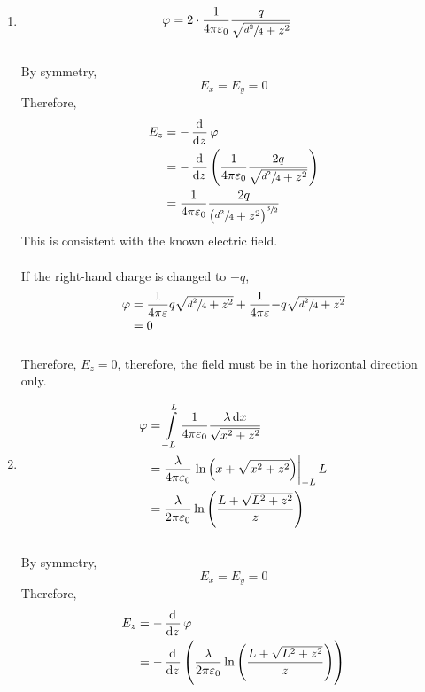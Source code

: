 \documentclass[fleqn, a4paper, 12pt, oneside]{amsart}
\theoremstyle{definition}
\theoremstyle{theorem}
\begin{document}
\begin{solution}
	\begin{enumerate}
		\item
			\begin{align*}
				\varphi &= 2 \cdot \dfrac{1}{4 \pi \varepsilon_0} \dfrac{q}{\sqrt{\sfrac{d^2}{4} + z^2}}
			\end{align*}
			~\\
			By symmetry,
			\begin{equation*}
				E_x = E_y = 0
			\end{equation*}
			Therefore,
			\begin{align*}
				E_z &= -\dod{}{z} \varphi\\
				&= -\dod{}{z} \left( \dfrac{1}{4 \pi \varepsilon_0} \dfrac{2q}{\sqrt{\sfrac{d^2}{4} + z^2}} \right)\\
				&= \dfrac{1}{4 \pi \varepsilon_0} \dfrac{2q}{\left( \sfrac{d^2}{4} + z^2 \right)^{\sfrac{3}{2}}}
			\end{align*}
			This is consistent with the known electric field.\\
			~\\
			If the right-hand charge is changed to $-q$,
			\begin{align*}
				\varphi &= \dfrac{1}{4 \pi \varepsilon}{q}{\sqrt{\sfrac{d^2}{4} + z^2}} + \dfrac{1}{4 \pi \varepsilon}{-q}{\sqrt{\sfrac{d^2}{4} + z^2}}\\
				&= 0
			\end{align*}\\
			Therefore, $E_z = 0$, therefore, the field must be in the horizontal direction only.
		\item
			\begin{align*}
				\varphi &= \int\limits_{-L}^{L} \dfrac{1}{4 \pi \varepsilon_0} \dfrac{\lambda \dif x}{\sqrt{x^2 + z^2}}\\
				&= \dfrac{\lambda}{4 \pi \varepsilon_0} \left. \ln \left( x + \sqrt{x^2 + z^2} \right) \right|_{-L}{L}\\
				&= \dfrac{\lambda}{2 \pi \varepsilon_0} \ln \left( \dfrac{L + \sqrt{L^2 + z^2}}{z} \right)
			\end{align*}
			~\\
			By symmetry,
			\begin{equation*}
				E_x = E_y = 0
			\end{equation*}
			Therefore,
			\begin{align*}
				E_z &= -\dod{}{z} \varphi\\
				&= -\dod{}{z} \left( \dfrac{\lambda}{2 \pi \varepsilon_0} \ln \left( \dfrac{L + \sqrt{L^2 + z^2}}{z} \right) \right)\\

\end{align*}
\end{enumerate}
\end{solution}
\end{document}
